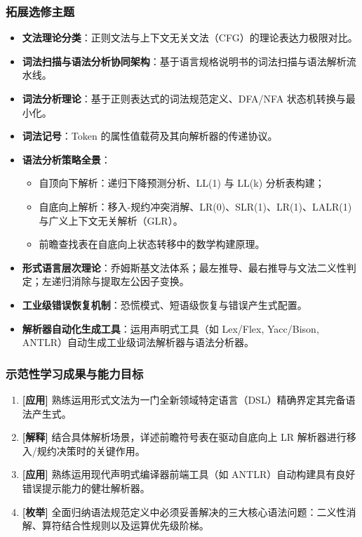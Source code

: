 \subsubsection{拓展选修主题}
\begin{itemize}
    \item \textbf{文法理论分类}：正则文法与上下文无关文法（CFG）的理论表达力极限对比。
    \item \textbf{词法扫描与语法分析协同架构}：基于语言规格说明书的词法扫描与语法解析流水线。
    \item \textbf{词法分析理论}：基于正则表达式的词法规范定义、DFA/NFA 状态机转换与最小化。
    \item \textbf{词法记号}：Token 的属性值载荷及其向解析器的传递协议。
    \item \textbf{语法分析策略全景}：
    \begin{itemize}
        \item 自顶向下解析：递归下降预测分析、LL(1) 与 LL(k) 分析表构建；
        \item 自底向上解析：移入-规约冲突消解、LR(0)、SLR(1)、LR(1)、LALR(1) 与广义上下文无关解析（GLR）。
        \item 前瞻查找表在自底向上状态转移中的数学构建原理。
    \end{itemize}
    \item \textbf{形式语言层次理论}：乔姆斯基文法体系；最左推导、最右推导与文法二义性判定；左递归消除与提取左公因子变换。
    \item \textbf{工业级错误恢复机制}：恐慌模式、短语级恢复与错误产生式配置。
    \item \textbf{解析器自动化生成工具}：运用声明式工具（如 Lex/Flex, Yacc/Bison, ANTLR）自动生成工业级词法解析器与语法分析器。
\end{itemize}

\subsubsection{示范性学习成果与能力目标}
\begin{enumerate}
    \item \textbf{[应用]} 熟练运用形式文法为一门全新领域特定语言（DSL）精确界定其完备语法产生式。
    \item \textbf{[解释]} 结合具体解析场景，详述前瞻符号表在驱动自底向上 LR 解析器进行移入/规约决策时的关键作用。
    \item \textbf{[应用]} 熟练运用现代声明式编译器前端工具（如 ANTLR）自动构建具有良好错误提示能力的健壮解析器。
    \item \textbf{[枚举]} 全面归纳语法规范定义中必须妥善解决的三大核心语法问题：二义性消解、算符结合性规则以及运算优先级阶梯。
\end{enumerate}

